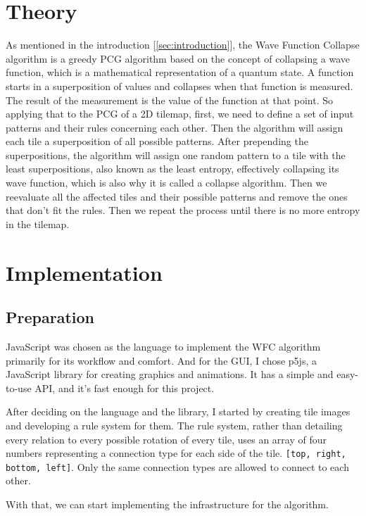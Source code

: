 \documentclass[10pt,twoside,a4paper]{article}
\begin{document}
\section{Theory}\label{sec:theory}
As mentioned in the introduction [\ref*{sec:introduction}], the Wave Function Collapse algorithm is a greedy PCG algorithm based on the concept of collapsing a wave function, which is a mathematical representation of a quantum state.
A function starts in a superposition of values and collapses when that function is measured.
The result of the measurement is the value of the function at that point.
So applying that to the PCG of a 2D tilemap, first, we need to define a set of input patterns and their rules concerning each other.
Then the algorithm will assign each tile a superposition of all possible patterns.
After prepending the superpositions, the algorithm will assign one random pattern to a tile with the least superpositions, also known as the least entropy, effectively collapsing its wave function, which is also why it is called a collapse algorithm.
Then we reevaluate all the affected tiles and their possible patterns and remove the ones that don't fit the rules.
Then we repeat the process until there is no more entropy in the tilemap.

\section{Implementation}\label{sec:implementation}
\subsection{Preparation}\label{sec:preparation}
JavaScript was chosen as the language to implement the WFC algorithm primarily for its workflow and comfort.
And for the GUI, I chose p5js, a JavaScript library for creating graphics and animations.
It has a simple and easy-to-use API, and it's fast enough for this project.

After deciding on the language and the library, I started by creating tile images and developing a rule system for them.
The rule system, rather than detailing every relation to every possible rotation of every tile, uses an array of four numbers representing a connection type for each side of the tile. \texttt{[top, right, bottom, left]}.
Only the same connection types are allowed to connect to each other.

With that, we can start implementing the infrastructure for the algorithm.
\end{document}
